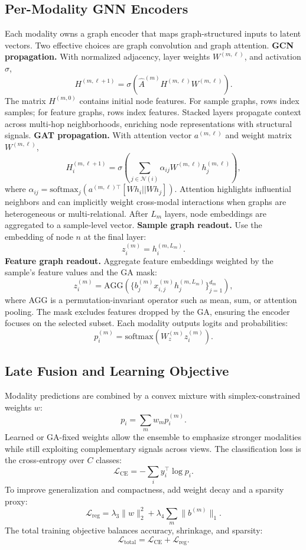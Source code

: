 \documentclass[11pt,a4paper]{article}
\begin{document}
\subsection{Per-Modality GNN Encoders}
Each modality owns a graph encoder that maps graph-structured inputs to latent vectors. Two effective choices are graph convolution and graph attention. \textbf{GCN propagation.} With normalized adjacency, layer weights $W^{(m,\ell)}$, and activation $\sigma$,
\[
H^{(m,\ell+1)} = \sigma \left( \hat{A}^{(m)} H^{(m,\ell)} W^{(m,\ell)} \right).
\]
The matrix $H^{(m,0)}$ contains initial node features. For sample graphs, rows index samples; for feature graphs, rows index features. Stacked layers propagate context across multi-hop neighborhoods, enriching node representations with structural signals. \textbf{GAT propagation.} With attention vector $a^{(m,\ell)}$ and weight matrix $W^{(m,\ell)}$,
\[
H_i^{(m,\ell+1)} = \sigma \left( \sum_{j \in \mathcal{N}(i)} \alpha_{ij} W^{(m,\ell)} h_j^{(m,\ell)} \right),
\]
where $\alpha_{ij} = \text{softmax}_j (a^{(m,\ell)\top} [W h_i || W h_j])$. Attention highlights influential neighbors and can implicitly weight cross-modal interactions when graphs are heterogeneous or multi-relational. After $L_m$ layers, node embeddings are aggregated to a sample-level vector. \textbf{Sample graph readout.} Use the embedding of node $n$ at the final layer:
\[
z_i^{(m)} = h_{i}^{(m,L_m)}.
\]
\textbf{Feature graph readout.} Aggregate feature embeddings weighted by the sample's feature values and the GA mask:
\[
z_i^{(m)} = \text{AGG} \left( \{ b_j^{(m)} x_{i,j}^{(m)} h_j^{(m,L_m)} \}_{j=1}^{d_m} \right),
\]
where AGG is a permutation-invariant operator such as mean, sum, or attention pooling. The mask excludes features dropped by the GA, ensuring the encoder focuses on the selected subset. Each modality outputs logits and probabilities:
\[
p_i^{(m)} = \text{softmax} \left( W_z^{(m)} z_i^{(m)} \right).
\]

\subsection{Late Fusion and Learning Objective}
Modality predictions are combined by a convex mixture with simplex-constrained weights $w$:
\[
p_i = \sum_m w_m p_i^{(m)}.
\]
Learned or GA-fixed weights allow the ensemble to emphasize stronger modalities while still exploiting complementary signals across views. The classification loss is the cross-entropy over $C$ classes:
\[
\mathcal{L}_\text{CE} = -\sum_i y_i^\top \log p_i.
\]
To improve generalization and compactness, add weight decay and a sparsity proxy:
\[
\mathcal{L}_\text{reg} = \lambda_3 \|w\|_2^2 + \lambda_4 \sum_m \|b^{(m)}\|_1.
\]
The total training objective balances accuracy, shrinkage, and sparsity:
\[
\mathcal{L}_\text{total} = \mathcal{L}_\text{CE} + \mathcal{L}_\text{reg}.
\]
\end{document}
